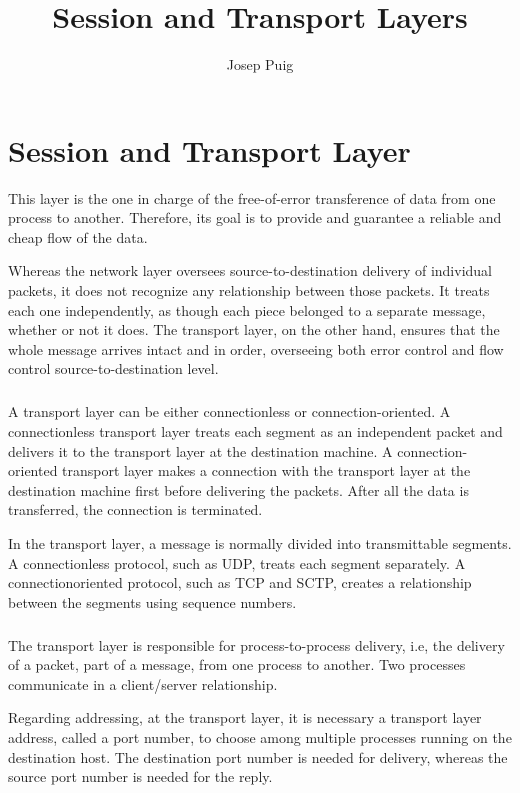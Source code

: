 \documentclass[12pt,a4paper]{report}
\author{Josep Puig}
\title{Session and Transport Layers}
\begin{document}
\maketitle


\chapter{Session and Transport Layer}

This layer is the one in charge of the free-of-error transference of data from one process to another. Therefore, its goal is to provide and guarantee a reliable and cheap flow of the data. 

Whereas the network layer oversees source-to-destination delivery of individual packets, it does not recognize any relationship between those packets. It treats each one independently, as though each piece belonged to a separate message, whether or not it does. The transport layer, on the other hand, ensures that the whole message arrives intact and in order, overseeing both error control and flow control source-to-destination level. 

\paragraph{}

A transport layer can be either connectionless or connection-oriented. A connectionless transport layer treats each segment as an independent packet and delivers it to the transport layer at the destination machine. A connection-oriented transport layer makes a connection with the transport layer at the destination machine first before delivering the packets. After all the data is transferred, the connection is terminated.

In the transport layer, a message is normally divided into transmittable segments. A connectionless protocol, such as UDP, treats each segment separately. A connectionoriented protocol, such as TCP and SCTP, creates a relationship between the segments using sequence numbers.
\paragraph{}


The transport layer is responsible for process-to-process delivery, i.e, the delivery of a packet, part of a message, from one process to another. Two processes communicate in a client/server relationship. 

Regarding addressing, at the transport layer, it is necessary a transport layer address, called a port number, to choose among multiple processes running on the destination host. The destination port number is needed for delivery, whereas the source port number is needed for the reply. 
\end{document}
